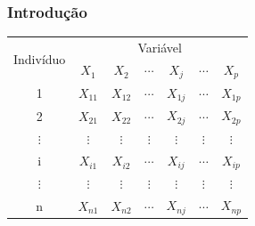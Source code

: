 \documentclass[14pt,aspectratio=1610]{beamer}
\begin{document}
\begin{frame}{}
\frametitle{Introdução}
\begin{block}{}
\justifying
\begin{table}[htp]
\begin{tabular}{c|c|c|c|c|c|c}
\hline
\multirow{2}{*}{Indivíduo}&\multicolumn{6}{c}{Variável}\\
\cline{2-7}
      &$X_{1}$&$X_{2}$&$\cdots$&$X_{j}$&$\cdots$&$X_{p}$\\
\hline
1       &$X_{11}$&$X_{12}$&$\cdots$&$X_{1j}$&$\cdots$&$X_{1p}$\\
2       &$X_{21}$&$X_{22}$&$\cdots$&$X_{2j}$&$\cdots$&$X_{2p}$\\
$\vdots$&$\vdots$&$\vdots$&$\vdots$&$\vdots$&$\vdots$&$\vdots$\\
i       &$X_{i1}$&$X_{i2}$&$\cdots$&$X_{ij}$&$\cdots$&$X_{ip}$\\
$\vdots$&$\vdots$&$\vdots$&$\vdots$&$\vdots$&$\vdots$&$\vdots$\\
n       &$X_{n1}$&$X_{n2}$&$\cdots$&$X_{nj}$&$\cdots$&$X_{np}$\\
\hline
\end{tabular}
\end{table}
\end{block}
\end{frame}
\end{document}
